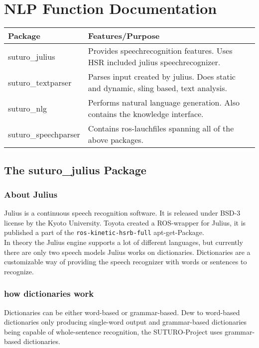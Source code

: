 \documentclass[main.tex]{subfiles}
\begin{document}
	\begingroup

	\renewcommand{\cleardoublepage}{}

	\renewcommand{\clearpage}{}
	
	\newpage

	\chapter{NLP Function Documentation}
		
		
	\begin{tabular}{|l|p{9cm}|}
		\hline
		\textbf{Package} & \textbf{Features/Purpose} \\
		\hline
		suturo\_julius & Provides speechrecognition features. Uses HSR included julius speechrecognizer. \\
		\hline 
		suturo\_textparser & Parses input created by julius. Does static and dynamic, sling based, text analysis. \\
		\hline
		suturo\_nlg & Performs natural language generation. Also contains the knowledge interface. \\
		\hline 
		suturo\_speechparser & Contains ros-lauchfiles spanning all of the above packages.\\
		\hline
	\end{tabular}
	
	\section{The suturo\_julius Package}
		\subsection{About Julius}
			Julius is a continuous speech recognition software. It is released under BSD-3 license by the Kyoto University. Toyota created a ROS-wrapper for Julius, it is published a part of the \texttt{ros-kinetic-hsrb-full} apt-get-Package.\\
			In theory the Julius engine supports a lot of different languages, but currently there are only two speech models
			Julius works on dictionaries. Dictionaries are a customizable way of providing the speech recognizer with words or sentences to recognize.
		\subsection{how dictionaries work}
			Dictionaries can be either word-based or grammar-based. Dew to word-based dictionaries only producing single-word output and grammar-based dictionaries being capable of whole-sentence recognition, the SUTURO-Project uses grammar-based dictionaries.
		
\end{document}
